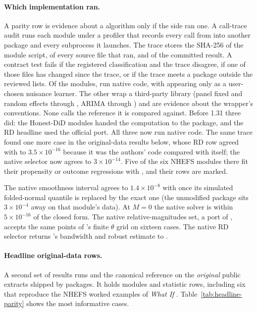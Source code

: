 \paragraph{Which implementation ran.}
A parity row is evidence about a \statspai{} algorithm only if the
 side ran one. A call-trace audit runs each module under a
profiler that records every call from \statspai{} into another package and
every subprocess it launches. The trace stores the SHA-256 of the module
script, of every \statspai{} source file that ran, and of the committed
result. A contract test fails if the registered classification and the
trace disagree, if one of those files has changed since the trace, or if
the trace meets a package outside the reviewed lists. Of the
\RParityModuleCount{} modules, \ParityNativeModuleCount{} run native code,
with  appearing only as a user-chosen nuisance learner.
The other \ParityThirdPartyModuleCount{} wrap a third-party library (panel
fixed and random effects through , ARIMA through
) and are evidence about the wrapper's conventions. None
calls the reference it is compared against. Before 1.31 three did: the
Honest-DiD modules handed the computation to the  package, and
the RD headline used the official   port.
All three now run native code. The same trace found one more case in the
original-data results below, whose RD row agreed with  to
\(3.5\times10^{-16}\) because it was the authors' code compared with
itself; the native selector now agrees to \(3\times10^{-14}\). Five of the
six NHEFS modules there fit their propensity or outcome regressions with
, and their rows are marked.

The native smoothness interval agrees to \(1.4\times10^{-8}\) with
 once its simulated folded-normal quantile is replaced by
the exact one (the unmodified package sits \(3\times10^{-4}\) away on that
module's data). At \(M=0\) the native solver is within \(5\times10^{-16}\)
of the closed form. The native relative-magnitudes set, a port of
\citet{andrews2023inference}, accepts the same points of 's
finite \(\theta\) grid on sixteen cases. The native RD selector returns
's bandwidth and robust estimate to \TrackARdNativeGap{}.

\paragraph{Headline original-data rows.}
A second set of results runs \statspai{} and the canonical 
reference on the \emph{original} public extracts shipped by 
packages. It holds \OrigParityModuleCount{} modules and
\OrigParityRowCount{} statistic rows, including six that reproduce the
NHEFS worked examples of \emph{What If} \citep{hernan2020causal}.
Table~\ref{tab:headline-parity} shows the most informative cases.

